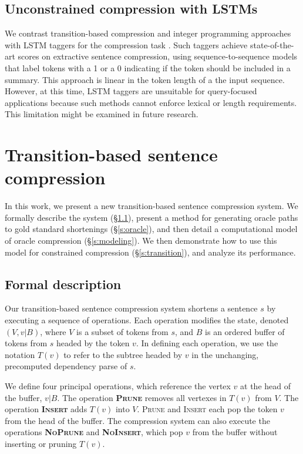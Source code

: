 \documentclass[11pt,a4paper]{article}
\begin{document}
\subsection{Unconstrained compression with LSTMs}

We contrast transition-based compression and integer programming approaches with LSTM taggers for the compression task \cite{filippova2015sentence}. Such taggers achieve state-of-the-art scores on extractive sentence compression, using sequence-to-sequence models that label tokens with a 1 or a 0 indicating if the token should be included in a summary. This approach is linear in the token length of a the input sequence. However, at this time, LSTM taggers are unsuitable for query-focused applications because such methods cannot enforce lexical or length requirements. This limitation might be examined in future research.

\section{Transition-based sentence compression}\label{s:system}

In this work, we present a new transition-based sentence compression system. We formally describe the system (\S\ref{s:formal}), present a method for generating oracle paths to gold standard shortenings (\S\ref{s:oracle}), and then detail a computational model of oracle compression (\S\ref{s:modeling}). We then demonstrate how to use this model for constrained compression (\S\ref{s:transition}), and analyze its performance.

\subsection{Formal description}\label{s:formal}

Our transition-based sentence compression system shortens a sentence $s$ by executing a sequence of operations. Each operation modifies the state, denoted $(V,v|B)$, where $V$ is a subset of tokens from $s$, and $B$ is an ordered buffer of tokens from $s$ headed by the token $v$. In defining each operation, we use the notation $T(v)$ to refer to the subtree headed by $v$ in the unchanging, precomputed dependency parse of $s$.

We define four principal operations, which reference the vertex $v$ at the head of the buffer, $v|B$. The operation \textbf{\textsc{Prune}} removes all vertexes in $T(v)$ from $V$. The operation \textbf{\textsc{Insert}} adds $T(v)$ into $V$. \textsc{Prune} and \textsc{Insert} each pop the token $v$ from the head of the buffer. The compression system can also execute the operations \textbf{\textsc{NoPrune}} and \textbf{\textsc{NoInsert}}, which pop $v$ from the buffer without inserting or pruning $T(v)$. 
\end{document}
